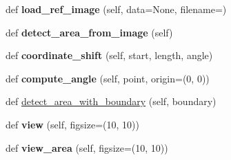 \begin{DoxyCompactItemize}
\item 
\mbox{\label{class_polygon_1_1_polygon_acedeedf4c9d9096480b77234e0b5bff6}} 
def {\bfseries load\+\_\+ref\+\_\+image} (self, data=None, filename=\textquotesingle{}\textquotesingle{})
\item 
\mbox{\label{class_polygon_1_1_polygon_ad69d216327c9efd55941419a8da0dbdd}} 
def {\bfseries detect\+\_\+area\+\_\+from\+\_\+image} (self)
\item 
\mbox{\label{class_polygon_1_1_polygon_a1a38b21a9ac111ef53bfb2b1e226bfcf}} 
def {\bfseries coordinate\+\_\+shift} (self, start, length, angle)
\item 
\mbox{\label{class_polygon_1_1_polygon_a838d48e973300e560dcef39a993917af}} 
def {\bfseries compute\+\_\+angle} (self, point, origin=(0, 0))
\item 
def \mbox{\hyperlink{class_polygon_1_1_polygon_a5a9ce3ae8751ce80222c5e5d2d38cc53}{detect\+\_\+area\+\_\+with\+\_\+boundary}} (self, boundary)
\item 
\mbox{\label{class_polygon_1_1_polygon_a5071220aa5bd8e2d5b1bfab9872d75d7}} 
def {\bfseries view} (self, figsize=(10, 10))
\item 
\mbox{\label{class_polygon_1_1_polygon_aa637d7bd4ed685ca0632e82ddb7f0680}} 
def {\bfseries view\+\_\+area} (self, figsize=(10, 10))
\end{DoxyCompactItemize}
